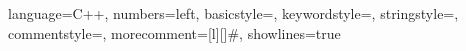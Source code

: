 \usepackage[utf8]{inputenc}
\usepackage{listings,bera}
\usepackage{multicol}
\usepackage{graphicx}
\usepackage{caption}
\usepackage{soul}
\usepackage{tikz}
\usepackage{mathtools}
\usepackage{xcolor}
\usepackage[absolute,overlay]{textpos}


\lstset
{
  language=C++,
  numbers=left,
  basicstyle=\ttfamily\scriptsize,
  keywordstyle=\color{blue}\ttfamily,
  stringstyle=\color{red}\ttfamily,
  commentstyle=\color{cyan}\ttfamily,
  morecomment=[l][\color{magenta}]{\#},
  showlines=true %
}

\newcommand{\listingNoLineNum}
{
\lstset{numbers=none}
}

\newcommand{\slide}[2]
{
\subsection*{#1}
\begin{frame}
\frametitle{#1}
#2
\end{frame}
}


\newcommand{\timelineSlide}[3]
{
    \subsection*{#2}
    \begin{frame}[#1]
        \frametitle{#2}
        #3
    \end{frame}
}


\newcommand{\sectionSlide}[3]
{
\section{#1}
{
\usebackgroundtemplate{
  \parbox[b][\paperheight][b]{\paperwidth}{\centering\texttt{[image: \#2]}}
}
\begin{frame}
\frametitle{#1}
\end{frame}
}
}

